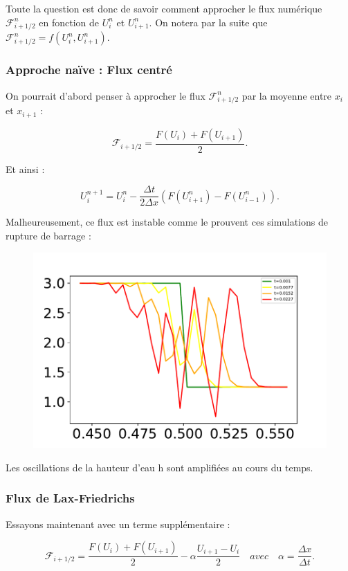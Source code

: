 \documentclass[
11pt, %
francais, %
singlespacing, %
headsepline, %
f%
]{MastersDoctoralThesis} %
\theoremstyle{definition}
\begin{document}
Toute la question est donc de savoir comment approcher le flux numérique $\mathcal{F}_{i+1/2} ^{n}$ en fonction de $U_i ^n$ et $U_{i+1} ^n$. On notera par la suite que $\mathcal{F}_{i+1/2} ^{n} = f(U_i ^n , U_{i+1} ^n)$.

\subsubsection{Approche naïve : Flux centré }

On pourrait d'abord penser à approcher le flux $\mathcal{F}_{i+1/2} ^{n}$ par la moyenne entre $x_i$ et $x_{i+1}$ :
 
$$ \mathcal{F}_{i+1/2} = \frac{F(U_i) + F(U_{i+1})}{2}.$$
 
Et ainsi :

$$ U_i ^{n+1} = U_i ^{n}  - \frac{\Delta t}{2 \Delta x} (F(U_{i+1} ^{n}) - F(U_{i-1} ^{n} )). $$

Malheureusement, ce flux est instable comme le prouvent ces simulations de rupture de barrage :

\begin{figure}
\centering
\includegraphics[scale = .7]{TestImageNaif.pdf}
\end{figure}

Les oscillations de la hauteur d'eau h sont amplifiées au cours du temps.

\subsubsection{Flux de Lax-Friedrichs}

Essayons maintenant avec un terme supplémentaire :

$$ \mathcal{F}_{i+1/2} = \frac{F(U_i) + F(U_{i+1})}{2} - \alpha \frac{U_{i+1} - U_i}{2} \quad avec \quad \alpha = \frac{\Delta x}{\Delta t}.$$
\end{document}

